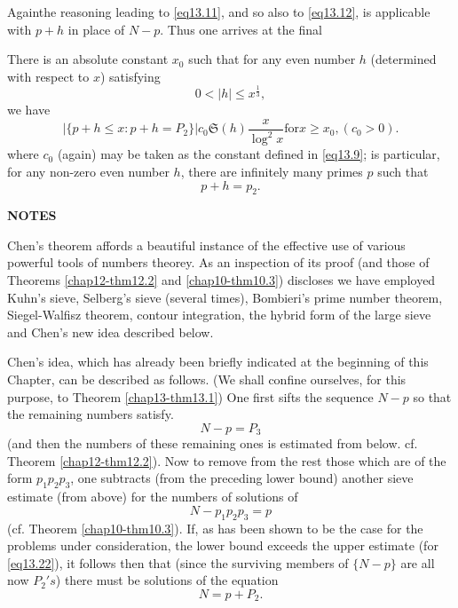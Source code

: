 Again\pageoriginale the reasoning leading to \eqref{eq13.11}, and so
also to \eqref{eq13.12}, is applicable with $p+h$ in place of
$N-p$. Thus one arrives at the final 
\begin{theorem}\label{chap13-thm13.2}%
There is an absolute constant $x_0$ such that for any even number
$h$ (determined with respect to $x$) satisfying 
\begin{equation*}
0 < |h| \le x^{\frac{1}{3}},\tag{13.18}\label{eq13.18}
\end{equation*}
we have 
\begin{equation*}
|\{p+h \le x: p+h =P_2 \} |c_0 \mathfrak{S}(h) \frac{x}{\log^2x}
\text{for} x \ge x_0, (c_0 >0).\tag{13.19}\label{eq13.19} 
\end{equation*}
where $c_0$ (again) may be taken as the constant defined in \eqref{eq13.9};
is particular, for any non-zero even number $h$, there are infinitely
many primes $p$ such that  
\begin{equation*}
p+h=p_2.\tag{13.20}\label{eq13.20}
\end{equation*} 
\end{theorem}

\medskip
\begin{center}
{\bf NOTES}
\end{center} 
 
Chen's theorem affords a beautiful instance of the effective use of
various  powerful tools of numbers theorey. As an inspection of its
proof (and  those of Theorems \ref{chap12-thm12.2} and
\ref{chap10-thm10.3}) discloses we have 
employed Kuhn's sieve, Selberg's sieve (several times), Bombieri's
prime number theorem, Siegel-Walfisz theorem, contour integration,
the hybrid form of the large sieve and Chen's new idea described
below. 
 
Chen's idea, which has already been briefly indicated at the beginning
of this Chapter, can be described as follows. (We shall confine
ourselves, for this purpose, to Theorem \ref{chap13-thm13.1}) 
One first sifts the sequence $N-p$ so that the remaining numbers
satisfy.   
\begin{equation*}
N-p = P_3\tag{13.21}\label{eq13.21}
\end{equation*} 
(and then the numbers of these remaining ones is estimated from
below. cf. Theorem \ref{chap12-thm12.2}). 
Now to remove from the rest those which are
of the form $p_1p_2p_3$,\pageoriginale 
one subtracts (from the preceding lower bound) 
another sieve estimate (from above) for the numbers of solutions of  
\begin{equation*}
N-p_1p_2p_3=p\tag{13.22}\label{eq13.22}
\end{equation*} 
(cf. Theorem \ref{chap10-thm10.3}). If, as has been shown to be the
case for the problems under consideration, the lower bound exceeds the
upper estimate (for \eqref{eq13.22}), it follows then that (since the
surviving members of $\{N-p\}$ are all now $P_2's$) there must be
solutions of the equation 
\begin{equation*}
N=p+P_2.\tag{13.23}\label{eq13.23}
\end{equation*}

